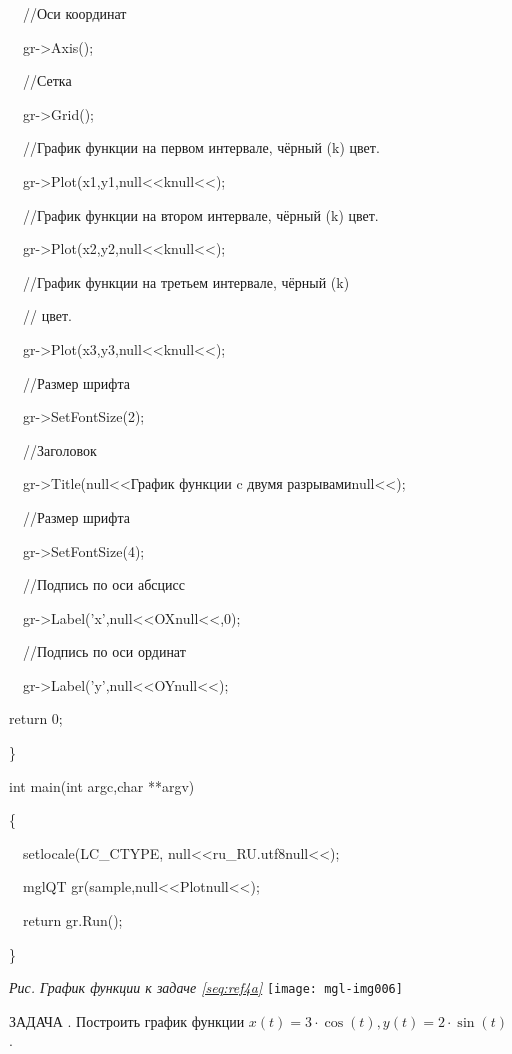 \ \ //Оси координат

\ \ gr-{\textgreater}Axis();

\ \ //Сетка

\ \ gr-{\textgreater}Grid();

\ \ //График функции на первом интервале, чёрный (k) цвет.

\ \ gr-{\textgreater}Plot(x1,y1,null{<<}knull{<<});

\ \ //График функции на втором интервале, чёрный (k) цвет.

\ \ gr-{\textgreater}Plot(x2,y2,null{<<}knull{<<});

\ \ //График функции на третьем интервале, чёрный (k)

\ \ // цвет.

\ \ gr-{\textgreater}Plot(x3,y3,null{<<}knull{<<});

\ \ //Размер шрифта

\ \ gr-{\textgreater}SetFontSize(2);

\ \ //Заголовок

\ \ gr-{\textgreater}Title(null{<<}График функции c двумя разрывамиnull{<<});

\ \ //Размер шрифта

\ \ gr-{\textgreater}SetFontSize(4);

\ \ //Подпись по оси абсцисс

\ \ gr-{\textgreater}Label('x',null{<<}OXnull{<<},0);

\ \ //Подпись по оси ординат

\ \  gr-{\textgreater}Label('y',null{<<}OYnull{<<});

return 0;

\}

int main(int argc,char **argv)

\{

\ \ setlocale(LC\_CTYPE, null{<<}ru\_RU.utf8null{<<});

\ \ mglQT gr(sample,null{<<}Plotnull{<<});

\ \ return gr.Run();

\}

\begin{minipage}{15.956cm}
{\itshape
Рис.  График функции к задаче \ref{seq:ref4a}}
\texttt{[image: mgl-img006]}\end{minipage}

ЗАДАЧА {\theqwerty\label{seq:ref5}}. Построить график функции  $x(t)=3\cdot \cos (t),y(t)=2\cdot
\sin (t)$ .

